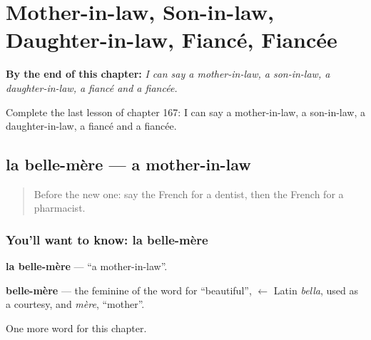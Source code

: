 
\chapter{Mother-in-law, Son-in-law, Daughter-in-law, Fiancé, Fiancée}
\label{ch:fr-mother-in-law-son-in-law-daughter-in-law-fiance-fiancee}

\begin{chapteropening}
\textbf{By the end of this chapter:} \emph{I can say a mother-in-law, a son-in-law, a daughter-in-law, a fiancé and a fiancée.}

Complete the last lesson of chapter 167: I can say a mother-in-law, a son-in-law, a daughter-in-law, a fiancé and a fiancée.
\end{chapteropening}

\section[la belle-mère]{la belle-mère — a mother-in-law}

\label{lesson:FR-C167-belle-mere}



\begin{quote}
Before the new one: say the French for a dentist, then the French for a pharmacist.
\end{quote}

\subsection*{You'll want to know: la belle-mère}
\textbf{la belle-mère} — \textquotedblleft{}a mother-in-law\textquotedblright{}.

\begin{cousinweb}
\textbf{belle-mère} — the feminine of the word for \textquotedblleft{}beautiful\textquotedblright{}, $\leftarrow$ Latin \emph{bella}, used as a courtesy, and \emph{mère}, \textquotedblleft{}mother\textquotedblright{}.
\end{cousinweb}

\begin{grammarlens}[title={What you've built}]
One more word for this chapter.
\end{grammarlens}


